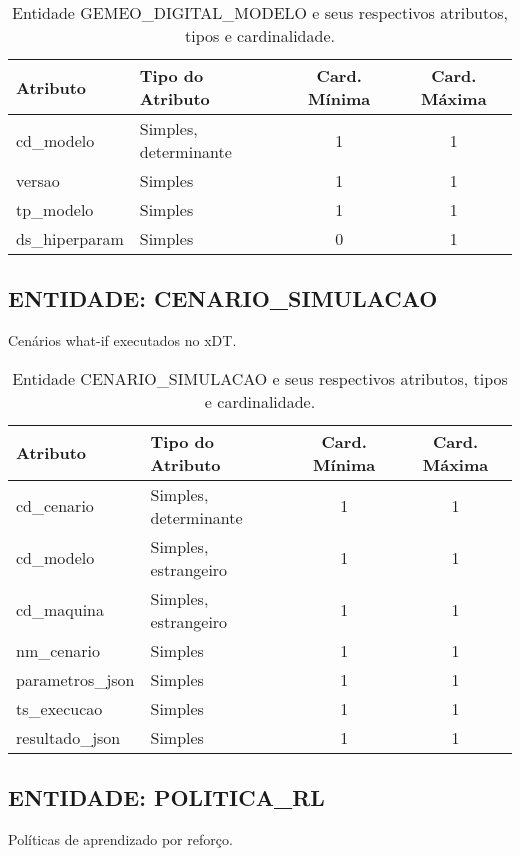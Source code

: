 \documentclass[10pt,a4paper]{article}
\begin{document}
\begin{table}[h!]
\centering
\begin{tabular}{| l | l | c | c |}
\hline
\rowcolor{red}\color{white}\textbf{Atributo} & \color{white}\textbf{Tipo do Atributo} & \color{white}\textbf{Card. Mínima} & \color{white}\textbf{Card. Máxima} \\
\hline
cd\_modelo & Simples, determinante & 1 & 1 \\
versao & Simples & 1 & 1 \\
tp\_modelo & Simples & 1 & 1 \\
ds\_hiperparam & Simples & 0 & 1 \\
\hline
\end{tabular}
\caption{Entidade GEMEO\_DIGITAL\_MODELO e seus respectivos atributos, tipos e cardinalidade.}
\label{tab:gemeo_digital_modelo}
\end{table}

\subsection*{ENTIDADE: CENARIO\_SIMULACAO}
Cenários what-if executados no xDT.

\begin{table}[h!]
\centering
\begin{tabular}{| l | l | c | c |}
\hline
\rowcolor{red}\color{white}\textbf{Atributo} & \color{white}\textbf{Tipo do Atributo} & \color{white}\textbf{Card. Mínima} & \color{white}\textbf{Card. Máxima} \\
\hline
cd\_cenario & Simples, determinante & 1 & 1 \\
cd\_modelo & Simples, estrangeiro & 1 & 1 \\
cd\_maquina & Simples, estrangeiro & 1 & 1 \\
nm\_cenario & Simples & 1 & 1 \\
parametros\_json & Simples & 1 & 1 \\
ts\_execucao & Simples & 1 & 1 \\
resultado\_json & Simples & 1 & 1 \\
\hline
\end{tabular}
\caption{Entidade CENARIO\_SIMULACAO e seus respectivos atributos, tipos e cardinalidade.}
\label{tab:cenario_simulacao}
\end{table}

\subsection*{ENTIDADE: POLITICA\_RL}
Políticas de aprendizado por reforço.
\end{document}
